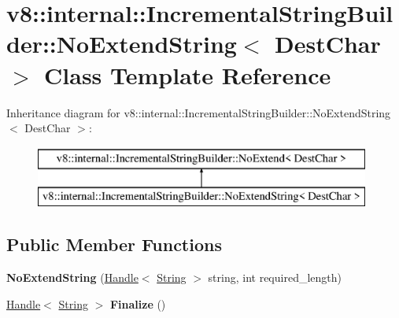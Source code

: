 \hypertarget{classv8_1_1internal_1_1_incremental_string_builder_1_1_no_extend_string}{}\section{v8\+:\+:internal\+:\+:Incremental\+String\+Builder\+:\+:No\+Extend\+String$<$ Dest\+Char $>$ Class Template Reference}
\label{classv8_1_1internal_1_1_incremental_string_builder_1_1_no_extend_string}
Inheritance diagram for v8\+:\+:internal\+:\+:Incremental\+String\+Builder\+:\+:No\+Extend\+String$<$ Dest\+Char $>$\+:\begin{figure}[H]
\begin{center}
\leavevmode
\includegraphics[height=2.000000cm]{classv8_1_1internal_1_1_incremental_string_builder_1_1_no_extend_string}
\end{center}
\end{figure}
\subsection*{Public Member Functions}
\begin{DoxyCompactItemize}
\item 
{\bfseries No\+Extend\+String} (\hyperlink{classv8_1_1internal_1_1_handle}{Handle}$<$ \hyperlink{classv8_1_1internal_1_1_string}{String} $>$ string, int required\+\_\+length)\hypertarget{classv8_1_1internal_1_1_incremental_string_builder_1_1_no_extend_string_aaf7a7f8934920386b38fb930e4aa7a67}{}\label{classv8_1_1internal_1_1_incremental_string_builder_1_1_no_extend_string_aaf7a7f8934920386b38fb930e4aa7a67}

\item 
\hyperlink{classv8_1_1internal_1_1_handle}{Handle}$<$ \hyperlink{classv8_1_1internal_1_1_string}{String} $>$ {\bfseries Finalize} ()\hypertarget{classv8_1_1internal_1_1_incremental_string_builder_1_1_no_extend_string_a1b8e59489ef4db1119fdf65512e84667}{}\label{classv8_1_1internal_1_1_incremental_string_builder_1_1_no_extend_string_a1b8e59489ef4db1119fdf65512e84667}

\end{DoxyCompactItemize}

